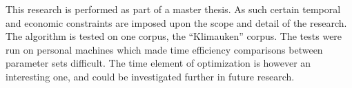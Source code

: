 This research is performed as part of a master thesis. As such certain temporal and economic constraints are imposed upon the scope and detail of the research. The algorithm is tested on one corpus, the ``Klimauken'' corpus. The tests were run on personal machines which made time efficiency comparisons between parameter sets difficult. The time element of optimization is however an interesting one, and could be investigated further in future research.